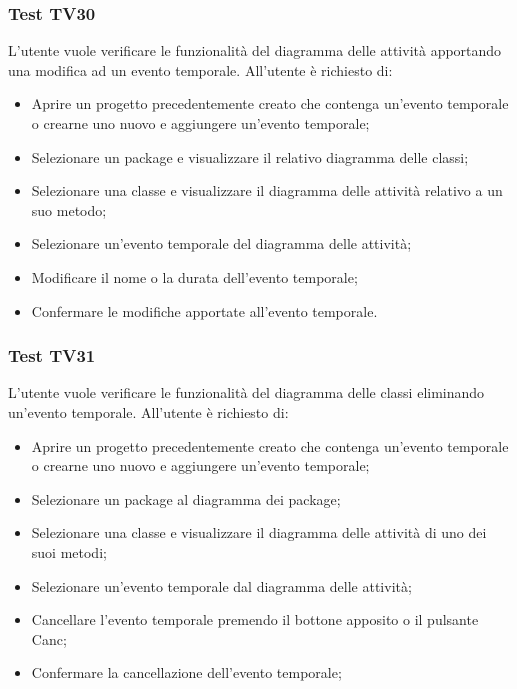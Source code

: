 \documentclass[../PianoDiQualifica.tex]{subfiles}
\begin{document}
	\subsubsection{Test TV30} 
	L'utente vuole verificare le funzionalità del diagramma delle attività apportando una modifica ad un evento temporale. 
	All'utente è richiesto di: 
	\begin{itemize} 
		\item Aprire un progetto precedentemente creato che contenga un'evento temporale o crearne uno nuovo e aggiungere un'evento temporale;
		\item Selezionare un package e visualizzare il relativo diagramma delle classi; 
		\item Selezionare una classe e visualizzare il diagramma delle attività relativo a un suo metodo; 
		\item Selezionare un'evento temporale del diagramma delle attività;
		\item Modificare il nome o la durata dell'evento temporale; 
		\item Confermare le modifiche apportate all'evento temporale. 
	\end{itemize} 
	
	
	\subsubsection{Test TV31} 
	L'utente vuole verificare le funzionalità del diagramma delle classi eliminando un'evento temporale. 
	All'utente è richiesto di: 
	\begin{itemize} 
		\item Aprire un progetto precedentemente creato che contenga un'evento temporale o crearne uno nuovo e aggiungere un'evento temporale;
		\item Selezionare un package al diagramma dei package; 
		\item Selezionare una classe e visualizzare il diagramma delle attività di uno dei suoi metodi; 
		\item Selezionare un'evento temporale dal diagramma delle attività; 
		\item Cancellare l'evento temporale premendo il bottone apposito o il pulsante Canc; 
		\item Confermare la cancellazione dell'evento temporale; 
	\end{itemize} 
	
	
	
\end{document}
